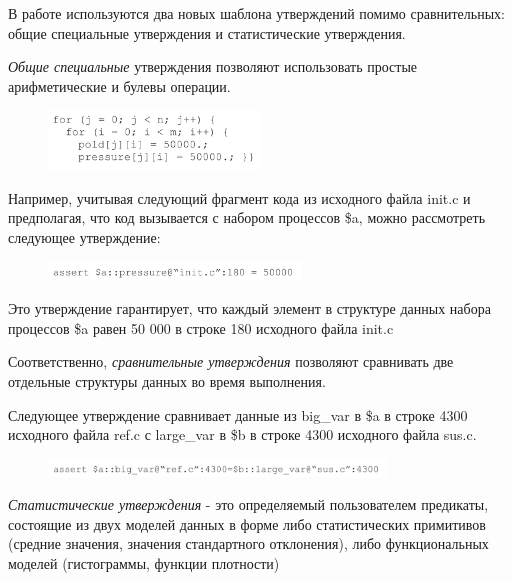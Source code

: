 В работе используются два новых шаблона утверждений помимо сравнительных: общие специальные утверждения и статистические утверждения.
\newline

\textit{Общие специальные} утверждения позволяют использовать простые арифметические и булевы операции.

\begin{figure}[h]
	\includegraphics[width=0.5\textwidth]{ResearchNotes/images/krekhtunova/data_prog.png}
\end{figure}

Например, учитывая следующий фрагмент кода из исходного файла init.c и предполагая, что код вызывается с набором процессов \$a, можно рассмотреть следующее утверждение:

\begin{figure}[h]
	\includegraphics[width=0.6\textwidth]{ResearchNotes/images/krekhtunova/assert1.png}
\end{figure}

Это утверждение гарантирует, что каждый элемент в структуре данных набора процессов \$a равен 50 000 в строке 180 исходного файла init.c
\newline

Соответственно, \textit{сравнительные утверждения} позволяют сравнивать две отдельные структуры данных во время выполнения.

Следующее утверждение сравнивает данные из big_var в \$a в строке 4300 исходного файла ref.c с large_var в \$b в строке 4300 исходного файла sus.c.

\begin{figure}[h]
	\includegraphics[width=0.8\textwidth]{ResearchNotes/images/krekhtunova/assert2.png}
\end{figure}

\textit{Статистические утверждения} - это определяемый пользователем предикаты, состоящие из двух моделей данных в форме либо статистических примитивов (средние значения, значения стандартного отклонения), либо функциональных моделей (гистограммы, функции плотности)

